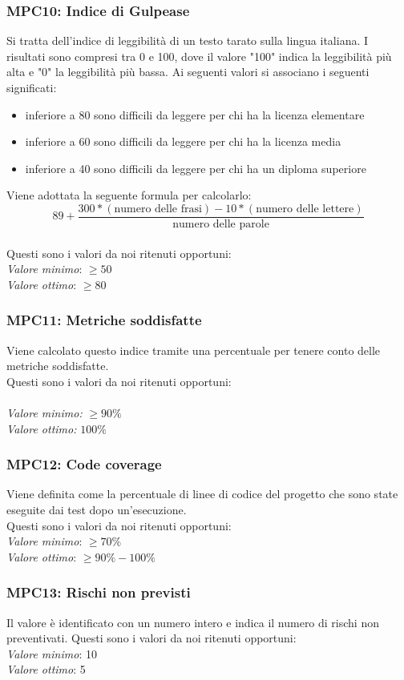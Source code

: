 \subsubsection{MPC10: Indice di Gulpease}
Si tratta dell'indice di leggibilità di un testo tarato sulla lingua italiana.
I risultati sono compresi tra 0 e 100, dove il valore "100" indica la leggibilità più alta e "0" la leggibilità più bassa. Ai seguenti valori si associano i seguenti significati:
\begin{itemize}
\item inferiore a 80 sono difficili da leggere per chi ha la licenza elementare
\item inferiore a 60 sono difficili da leggere per chi ha la licenza media
\item inferiore a 40 sono difficili da leggere per chi ha un diploma superiore
\end{itemize}
Viene adottata la seguente formula per calcolarlo:
\begin{equation*}
89+\frac{300*(\text{numero delle frasi})-10*(\text{numero delle lettere})}{\text{numero delle parole}}
\end{equation*}\\
Questi sono i valori da noi ritenuti opportuni:\\
\textit{Valore minimo}: $ \ge 50 $\\ 
\textit{Valore ottimo}: $ \ge 80 $\\

\subsubsection{MPC11: Metriche soddisfatte}
Viene calcolato questo indice tramite una percentuale per tenere conto delle metriche soddisfatte.\\
Questi sono i valori da noi ritenuti opportuni:\\\\
\textit{Valore minimo:} $ \ge 90\% $\\
\textit{Valore ottimo:} $ 100\% $\\

\subsubsection{MPC12: Code coverage}
Viene definita come la percentuale di linee di codice del progetto che sono state eseguite dai test dopo un'esecuzione.\\
Questi sono i valori da noi ritenuti opportuni:\\
\textit{Valore minimo}: $ \ge 70\% $\\
\textit{Valore ottimo}: $ \ge 90\% - 100\% $\\

\subsubsection{MPC13: Rischi non previsti}
Il valore è identificato con un numero intero e indica il numero di rischi non preventivati.
Questi sono i valori da noi ritenuti opportuni:\\
\textit{Valore minimo}: 10\\
\textit{Valore ottimo}: 5\\